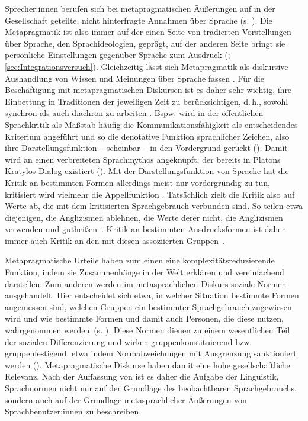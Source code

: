 Sprecher:innen berufen sich bei metapragmatischen {\"A}u{\ss}erungen auf in der Gesellschaft geteilte, nicht hinterfragte Annahmen über Sprache (s. \cites[1]{Gunthner.2012}[205]{Konig2015}). 
Die Metapragmatik ist also immer auf der einen Seite von tradierten Vorstellungen über Sprache, den Sprachideologien, geprägt, auf der anderen Seite bringt sie persönliche Einstellungen gegenüber Sprache zum Ausdruck (\cites[s.][196--197]{Silverstein2003}[1319]{Vandermeeren2005}{Spitzmuller2013}; \autoref{sec:Integrationsversuch}). 
Gleichzeitig lässt sich Metapragmatik als diskursive Aushandlung von Wissen und Meinungen über Sprache fassen \citep[s.][263]{Spitzmuller2013}. 
Für die Beschäftigung mit metapragmatischen Diskursen ist es daher sehr wichtig, ihre Einbettung in Traditionen der jeweiligen Zeit zu berücksichtigen, d.\,h., sowohl synchron als auch diachron zu arbeiten \citep[s.][325]{Spitzmuller2014}. 
Bspw. wird in der {\"o}ffentlichen Sprachkritik als Ma{\ss}stab h{\"a}ufig die Kommunikationsf{\"a}higkeit als entscheidendes Kriterium angef{\"u}hrt und so die denotative Funktion sprachlicher Zeichen, also ihre Darstellungsfunktion -- scheinbar -- in den Vordergrund ger{\"u}ckt (\cites[s.][]{Buhler.1999}[190]{Spitzmuller.2007}[322]{Langer.}[128]{Silverstein.2014}). 
Damit wird an einen verbreiteten Sprachmythos angeknüpft, der bereits in Platons Kratylos-Dialog existiert (\cites[s.][57]{Heringer.2015}[116]{Gal.2016}). 
Mit der Darstellungsfunktion von Sprache hat die Kritik an bestimmten Formen allerdings meist nur vordergr{\"u}ndig zu tun, kritisiert wird vielmehr die Appellfunktion \citep[s.][]{Buhler.1999}. 
Tatsächlich zielt die Kritik also auf Werte ab, die mit dem kritisierten Sprachgebrauch verbunden sind. 
So teilen etwa diejenigen, die Anglizismen ablehnen, die Werte derer nicht, die Anglizismen verwenden und guthei{\ss}en~\citep[s.][191]{Spitzmuller.2007}.
Kritik an bestimmten Ausdrucksformen ist daher immer auch Kritik an den mit diesen assoziierten Gruppen~\citep[s.][191]{Spitzmuller.2007}. 

Metapragmatische Urteile haben zum einen eine komplexit{\"a}tsreduzierende Funktion, indem sie Zusammenh{\"a}nge in der Welt erkl{\"a}ren und vereinfachend darstellen. 
Zum anderen werden im metasprachlichen Diskurs soziale Normen ausgehandelt. 
Hier entscheidet sich etwa, in welcher Situation bestimmte Formen angemessen sind, welchen Gruppen ein bestimmter Sprachgebrauch zugewiesen wird und wie bestimmte Formen und damit auch Personen, die diese nutzen, wahrgenommen werden~(s. \cites[17]{Agha2007}[200]{Konig2015}). 
Diese Normen dienen zu einem wesentlichen Teil der sozialen Differenzierung und wirken gruppenkonstituierend bzw. gruppenfestigend, etwa indem Normabweichungen mit Ausgrenzung sanktioniert werden (\cites[s.][3]{Garrett2003}[33]{Garrett.2012}[114]{Gal.2016}).
Metapragmatische Diskurse haben damit eine hohe gesellschaftliche Relevanz.
Nach der Auffassung von \citet[103]{Arendt2015} ist es daher die Aufgabe der Linguistik, Sprachnormen nicht nur auf der Grundlage des beobachtbaren Sprachgebrauchs, sondern auch auf der Grundlage metasprachlicher {\"A}u{\ss}erungen von Sprachbenutzer:innen zu beschreiben.
 
